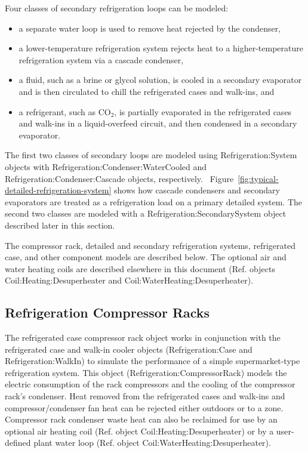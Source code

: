Four classes of secondary refrigeration loops can be modeled:

\begin{itemize}
  \item a separate water loop is used to remove heat rejected by the condenser,
  \item a lower-temperature refrigeration system rejects heat to a higher-temperature refrigeration system via a cascade condenser,
  \item a fluid, such as a brine or glycol solution, is cooled in a secondary evaporator and is then circulated to chill the refrigerated cases and walk-ins, and
  \item a refrigerant, such as CO\(_{2}\), is partially evaporated in the refrigerated cases and walk-ins in a liquid-overfeed circuit, and then condensed in a secondary evaporator.
\end{itemize}

The first two classes of secondary loops are modeled using Refrigeration:System objects with Refrigeration:Condenser:WaterCooled and Refrigeration:Condenser:Cascade objects, respectively.~ Figure~\ref{fig:typical-detailed-refrigeration-system} shows how cascade condensers and secondary evaporators are treated as a refrigeration load on a primary detailed system. The second two classes are modeled with a Refrigeration:SecondarySystem object described later in this section.

The compressor rack, detailed and secondary refrigeration systems, refrigerated case, and other component models are described below. The optional air and water heating coils are described elsewhere in this document (Ref. objects Coil:Heating:Desuperheater and Coil:WaterHeating:Desuperheater).

\subsection{Refrigeration Compressor Racks}\label{refrigeration-compressor-racks}

The refrigerated case compressor rack object works in conjunction with the refrigerated case and walk-in cooler objects (Refrigeration:Case and Refrigeration:WalkIn) to simulate the performance of a simple supermarket-type refrigeration system. This object (Refrigeration:CompressorRack) models the electric consumption of the rack compressors and the cooling of the compressor rack's condenser. Heat removed from the refrigerated cases and walk-ins and compressor/condenser fan heat can be rejected either outdoors or to a zone. Compressor rack condenser waste heat can also be reclaimed for use by an optional air heating coil (Ref. object Coil:Heating:Desuperheater) or by a user-defined plant water loop (Ref. object Coil:WaterHeating:Desuperheater).

